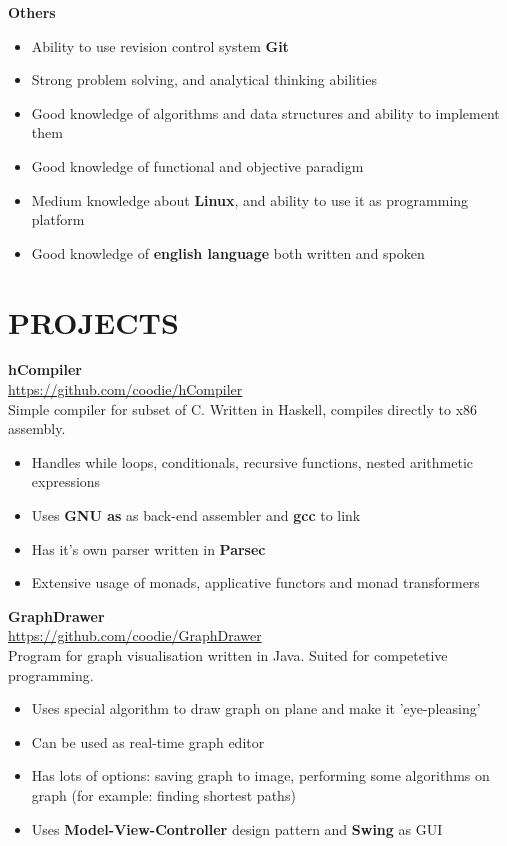 \documentclass[line]{res}
\begin{document}
\begin{resume}
\textbf{Others}
\begin{itemize}
\item{Ability to use revision control system \textbf{Git} }
\item{Strong problem solving, and analytical thinking abilities }
\item{Good knowledge of algorithms and data structures and ability to implement them}
\item{Good knowledge of functional and objective paradigm}
\item{Medium knowledge about \textbf{Linux}, and ability to use it as programming platform}
\item{Good knowledge of \textbf{english language} both written and spoken}
\end{itemize}
\pagebreak
\section{PROJECTS}
\textbf{hCompiler} \\
\url{https://github.com/coodie/hCompiler} \\
Simple compiler for subset of C. Written in Haskell, compiles directly to x86 assembly. \\

\begin{itemize}
\item{Handles while loops, conditionals, recursive functions, nested arithmetic expressions}
\item{Uses \textbf{GNU as} as back-end assembler and \textbf{gcc} to link}
\item{Has it's own parser written in \textbf{Parsec} }
\item{Extensive usage of monads, applicative functors and monad transformers}
\end{itemize}



\textbf{GraphDrawer} \\
\url{https://github.com/coodie/GraphDrawer} \\
Program for graph visualisation written in Java. Suited for competetive programming. \\

\begin{itemize}

\item{Uses special algorithm to draw graph on plane and make it 'eye-pleasing'}
\item{Can be used as real-time graph editor}
\item{Has lots of options: saving graph to image, performing some algorithms on graph  (for example: finding shortest paths)}
\item{Uses \textbf{Model-View-Controller} design pattern and \textbf{Swing} as GUI}
\end{itemize}


\end{resume}
\end{document}
